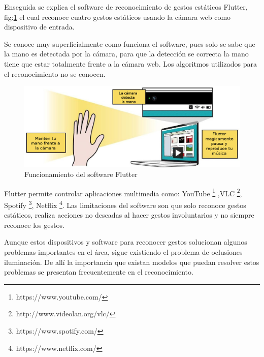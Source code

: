 Enseguida se explica el software de reconocimiento de gestos estáticos Flutter, fig:\ref{fig:Flutter} el cual reconoce cuatro gestos estáticos usando la cámara web como dispositivo de entrada. 

Se conoce muy superficialmente como funciona el software, pues solo se sabe que la mano es detectada por la cámara, para que la detección se correcta la mano tiene que estar totalmente frente a la cámara web. Los algoritmos utilizados para el reconocimiento no se conocen.  
\begin{figure}[h!]
\begin{center}
\includegraphics[scale=.4]{./Figures/Flutter.jpg}
\end{center}
\caption{Funcionamiento del software Flutter}
\label{fig:Flutter}
\end{figure}

Flutter permite controlar aplicaciones multimedia como: YouTube \footnote{https://www.youtube.com/} ,VLC \footnote{http://www.videolan.org/vlc/}, Spotify \footnote{https://www.spotify.com/}, Netflix \footnote{https://www.netflix.com/}. Las limitaciones del software son que solo reconoce gestos estáticos, realiza acciones no deseadas al hacer gestos involuntarios y no siempre reconoce los gestos.  


Aunque estos dispositivos y software para reconocer gestos solucionan algunos problemas importantes en el área, sigue existiendo el problema de oclusiones iluminación.
De allí la importancia que existan modelos que puedan resolver estos problemas se presentan frecuentemente en el reconocimiento.





